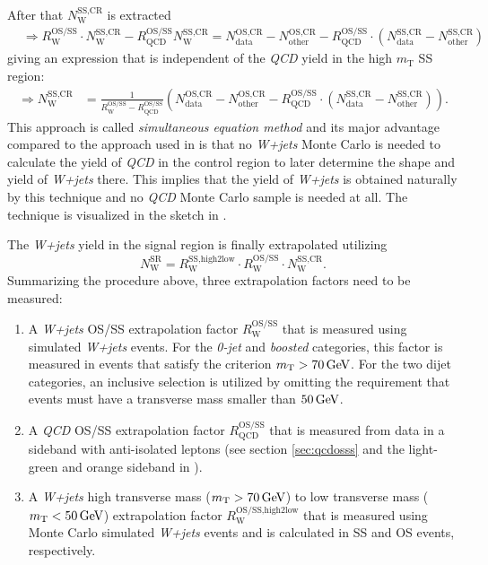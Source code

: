 After that $N_\text{W}^\text{SS,CR}$ is extracted
\begin{align*}
    &\Rightarrow R_\text{W}^\text{OS/SS} \cdot N_\text{W}^\text{SS,CR} - R_\text{QCD}^\text{OS/SS} N_\text{W}^\text{SS,CR}  = N_\text{data}^\text{OS,CR} - N_\text{other}^\text{OS,CR} - R_\text{QCD}^\text{OS/SS}\cdot \left( N_\text{data}^\text{SS,CR} - N_\text{other}^\text{SS,CR} \right)    
\end{align*} 
giving an expression that is independent of the \textit{QCD} yield in the high $m_\text{T}$ SS region:
\begin{align}\label{BR:eq:simeqn_1}
\Rightarrow N_\text{W}^\text{SS,CR} &=  \frac{1}{R_\text{W}^\text{OS/SS}-R_\text{QCD}^\text{OS/SS}} \left(  N_\text{data}^\text{OS,CR} - N_\text{other}^\text{OS,CR} - R_\text{QCD}^\text{OS/SS}\cdot \left( N_\text{data}^\text{SS,CR} - N_\text{other}^\text{SS,CR} \right) \right).
\end{align}
This approach is called \textit{simultaneous equation method} and its major advantage compared to the approach used in \cite{Sirunyan:2017khh} is that no
\textit{W+jets} Monte Carlo is needed to calculate the yield of \textit{QCD} in the control region to later determine the shape and yield of \textit{W+jets} there. 
This implies that the yield of \textit{W+jets} is obtained naturally by this technique and no \textit{QCD} Monte Carlo sample is needed at all. 
The technique is visualized in the sketch in .

The \textit{W+jets} yield in the signal region is finally extrapolated utilizing
\begin{equation}
    N_\text{W}^\text{SR} = R_\text{W}^\text{SS,high2low}\cdot R_\text{W}^\text{OS/SS}\cdot N_\text{W}^\text{SS,CR}. 
\end{equation}\label{BR:eq:simeqn_2}
Summarizing the procedure above, three extrapolation factors need to be measured: %
\begin{enumerate}
    \item A \textit{W+jets} OS/SS extrapolation factor $R_\text{W}^\text{OS/SS}$ that is measured using simulated \textit{W+jets} events. For the \textit{0-jet} and \textit{boosted} categories, this factor is measured in events that satisfy the criterion $m_\text{T}>\text{70\,{GeV}}$. For the two dijet categories, an inclusive selection is utilized by omitting the requirement that events must have a transverse mass smaller than $\text{50\,GeV}$.
    \item A \textit{QCD} OS/SS extrapolation factor $R_\text{QCD}^\text{OS/SS}$ that is measured from data in a sideband with anti-isolated leptons (see section \ref{sec:qcdosss} and the light-green and orange sideband in ).
    \item A \textit{W+jets} high transverse mass ($m_\text{T}>\text{70\,{GeV}}$) to low transverse mass ($m_\text{T}<\text{50\,{GeV}}$) extrapolation factor $R_\text{W}^\text{OS/SS,high2low}$ that is measured using Monte Carlo simulated \textit{W+jets} events and is calculated in SS and OS events, respectively.
\end{enumerate} 

